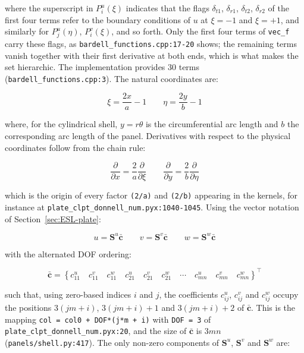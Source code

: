\noindent where the superscript in $P_i^u(\xi)$ indicates that the flags $\delta_{t1}$, $\delta_{r1}$, $\delta_{t2}$, $\delta_{r2}$ of the first four terms refer to the boundary conditions of $u$ at $\xi = -1$ and $\xi = +1$, and similarly for $P_j^u(\eta)$, $P_i^v(\xi)$, and so forth. Only the first four terms of \texttt{vec\_f} carry these flags, as \texttt{bardell\_functions.cpp:17-20} shows; the remaining terms vanish together with their first derivative at both ends, which is what makes the set hierarchic. The implementation provides 30 terms (\texttt{bardell\_functions.cpp:3}). The natural coordinates are:

\begin{equation*}
	\xi = \frac{2x}{a} - 1 \qquad \eta = \frac{2y}{b} - 1
\end{equation*}

\noindent where, for the cylindrical shell, $y = r\theta$ is the circumferential arc length and $b$ the corresponding arc length of the panel. Derivatives with respect to the physical coordinates follow from the chain rule:

\begin{equation*}
	\frac{\partial}{\partial x} = \frac{2}{a}\frac{\partial}{\partial \xi} \qquad \frac{\partial}{\partial y} = \frac{2}{b}\frac{\partial}{\partial \eta}
\end{equation*}

\noindent which is the origin of every factor \texttt{(2/a)} and \texttt{(2/b)} appearing in the kernels, for instance at \texttt{plate\_clpt\_donnell\_num.pyx:1040-1045}. Using the vector notation of Section~\ref{sec:ESL-plate}:

\begin{equation*}
	u = \boldsymbol{S}^u \bar{\boldsymbol{c}} \qquad v = \boldsymbol{S}^v \bar{\boldsymbol{c}} \qquad w = \boldsymbol{S}^w \bar{\boldsymbol{c}}
\end{equation*}

\noindent with the alternated DOF ordering:

\begin{equation*}
	\bar{\boldsymbol{c}} = \left\{ c_{11}^u \quad c_{11}^v \quad c_{11}^w \quad c_{21}^u \quad c_{21}^v \quad c_{21}^w \quad \cdots \quad c_{mn}^u \quad c_{mn}^v \quad c_{mn}^w \right\}^\top
\end{equation*}

\noindent such that, using zero-based indices $i$ and $j$, the coefficients $c_{ij}^u$, $c_{ij}^v$ and $c_{ij}^w$ occupy the positions $3(jm+i)$, $3(jm+i)+1$ and $3(jm+i)+2$ of $\bar{\boldsymbol{c}}$. This is the mapping \texttt{col = col0 + DOF*(j*m + i)} with \texttt{DOF = 3} of \texttt{plate\_clpt\_donnell\_num.pyx:20}, and the size of $\bar{\boldsymbol{c}}$ is $3mn$ (\texttt{panels/shell.py:417}). The only non-zero components of $\boldsymbol{S}^u$, $\boldsymbol{S}^v$ and $\boldsymbol{S}^w$ are:

